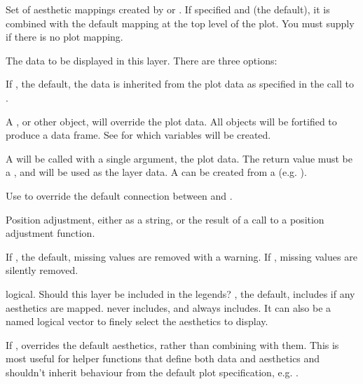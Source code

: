 \documentclass[a4paper]{book}
\begin{document}
\begin{Arguments}
\begin{ldescription}
\item[\code{mapping}] Set of aesthetic mappings created by  or
. If specified and  (the
default), it is combined with the default mapping at the top level of the
plot. You must supply  if there is no plot mapping.

\item[\code{data}] The data to be displayed in this layer. There are three
options:

If , the default, the data is inherited from the plot
data as specified in the call to .

A , or other object, will override the plot
data. All objects will be fortified to produce a data frame. See
 for which variables will be created.

A  will be called with a single argument,
the plot data. The return value must be a , and
will be used as the layer data. A  can be created
from a  (e.g. ).

\item[\code{stat}] Use to override the default connection between
 and .

\item[\code{position}] Position adjustment, either as a string, or the result of
a call to a position adjustment function.

\item[\code{na.rm}] If , the default, missing values are removed with
a warning. If , missing values are silently removed.

\item[\code{show.legend}] logical. Should this layer be included in the legends?
, the default, includes if any aesthetics are mapped.
 never includes, and  always includes.
It can also be a named logical vector to finely select the aesthetics to
display.

\item[\code{inherit.aes}] If , overrides the default aesthetics,
rather than combining with them. This is most useful for helper functions
that define both data and aesthetics and shouldn't inherit behaviour from
the default plot specification, e.g. .


\end{ldescription}
\end{Arguments}
\end{document}
